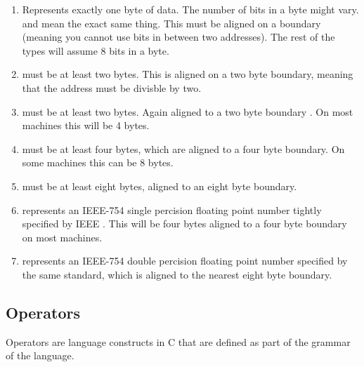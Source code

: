 \begin{enumerate}
	\item {} Represents exactly one byte of data. The number of bits in a byte might vary.  and  mean the exact same thing. This must be aligned on a boundary (meaning you cannot use bits in between two addresses). The rest of the types will assume 8 bits in a byte.
	\item {} must be at least two bytes. This is aligned on a two byte boundary, meaning that the address must be divisble by two.
	\item {} must be at least two bytes. Again aligned to a two byte boundary \cite[P. 34]{ISON1124}. On most machines this will be 4 bytes.
	\item {} must be at least four bytes, which are aligned to a four byte boundary. On some machines this can be 8 bytes.
	\item {} must be at least eight bytes, aligned to an eight byte boundary.
	\item {} represents an IEEE-754 single percision floating point number tightly specified by IEEE \cite{4610935}. This will be four bytes aligned to a four byte boundary on most machines.
	\item {} represents an IEEE-754 double percision floating point number specified by the same standard, which is aligned to the nearest eight byte boundary.
\end{enumerate}

\subsection{Operators}

Operators are language constructs in C that are defined as part of the grammar of the language.

